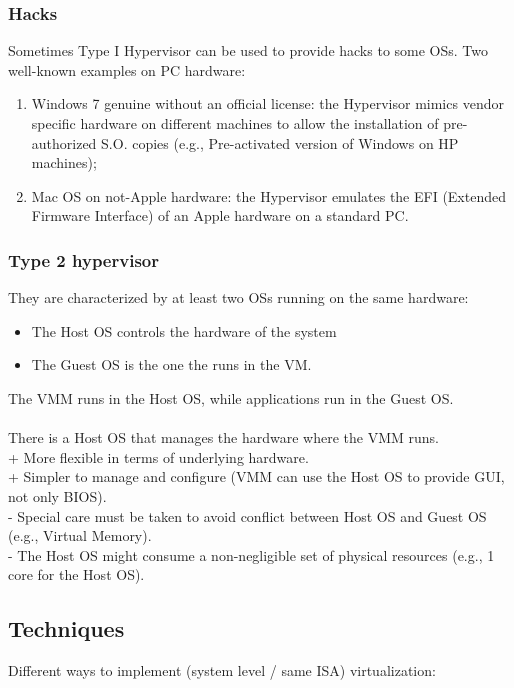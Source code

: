 \documentclass[10pt, oneside]{article}
\begin{document}
\subsubsection*{Hacks}
Sometimes Type I Hypervisor can be used to provide hacks to some OSs.
Two well-known examples on PC hardware:\begin{enumerate}
    \item Windows 7 genuine without an official license: the Hypervisor mimics vendor specific hardware on different machines to allow the installation of pre-authorized S.O. copies (e.g., Pre-activated version of Windows on HP machines);
    \item Mac OS on not-Apple hardware: the Hypervisor emulates the EFI (Extended Firmware Interface) of an Apple hardware on a standard PC.
\end{enumerate}
\subsubsection{Type 2 hypervisor}
They are characterized by at least two OSs running on the same hardware:\begin{itemize}
    \item The Host OS controls the hardware of the system
    \item The Guest OS is the one the runs in the VM.
\end{itemize}
The VMM runs in the Host OS, while applications run in the Guest OS.\\\\
There is a Host OS that manages the hardware where the VMM runs.\\
+ More flexible in terms of underlying hardware.\\
+ Simpler to manage and configure (VMM can use
the Host OS to provide GUI, not only BIOS).\\
- Special care must be taken to avoid conflict between Host OS and Guest OS (e.g., Virtual Memory).\\
- The Host OS might consume a non-negligible set of physical resources (e.g., 1 core for the Host OS).

\subsection{Techniques}
Different ways to implement (system level / same ISA) virtualization:
\end{document}

